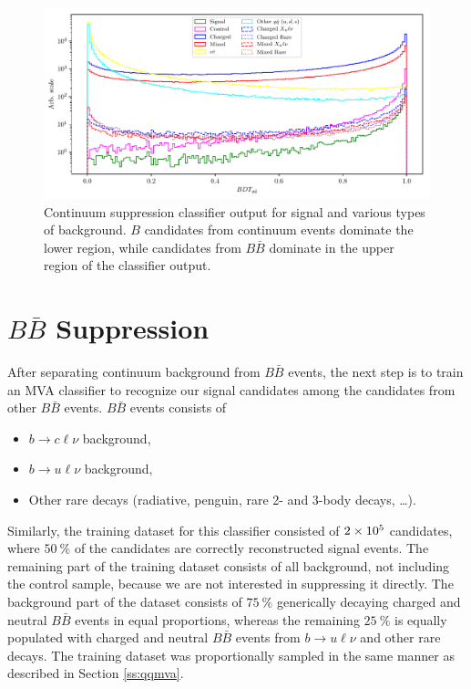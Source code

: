 \begin{figure}[H]
	\centering
	\captionsetup{width=0.8\linewidth}
	\includegraphics[width=\linewidth]{fig/cs_BDT}
	\caption{Continuum suppression classifier output for signal and various types of background. $B$ candidates from continuum events dominate the lower region, while candidates from $B\bar B$ dominate in the upper region of the classifier output.}
	\label{fig:cs_mva}
\end{figure}

\section{\texorpdfstring{$B\bar B$}{BB-bar} Suppression}

After separating continuum background from $B \bar B$ events, the next step is to train an MVA classifier to recognize our signal candidates among the candidates from other $B \bar B$ events. $B \bar B$ events consists of
\begin{itemize}
	\item $b \to c \ell \nu$ background,
	\item $b \to u \ell \nu$ background,
	\item Other rare decays (radiative, penguin, rare 2- and 3-body decays, \dots).
\end{itemize}

Similarly, the training dataset for this classifier consisted of $2\times 10^{5}$ candidates, where $50~\%$ of the candidates are correctly reconstructed signal events. The remaining part of the training dataset consists of all background, not including the control sample, because we are not interested in suppressing it directly. The background part of the dataset consists of $75~\%$  generically decaying charged and neutral $B \bar B$ events in equal proportions, whereas the remaining $25~\%$ is equally populated with charged and neutral $B \bar B$ events from $b \to u \ell \nu$ and other rare decays. The training dataset was proportionally sampled in the same manner as described in Section \ref{ss:qqmva}.

